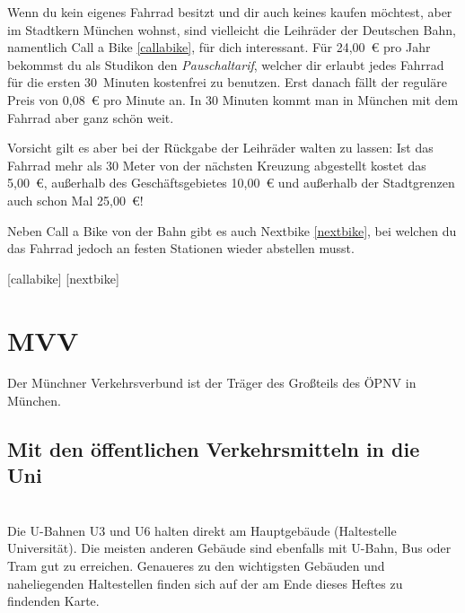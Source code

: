Wenn du kein eigenes Fahrrad besitzt und dir auch keines kaufen möchtest, aber im
Stadtkern München wohnst, sind vielleicht die Leihräder der Deutschen Bahn,
namentlich Call a Bike \ref{callabike}, für dich interessant. Für 24,00~€ pro
Jahr bekommst du als Studikon den \emph{Pauschaltarif}, welcher dir erlaubt jedes
Fahrrad für die ersten 30~Minuten kostenfrei zu benutzen. Erst danach fällt der
reguläre Preis von 0,08~€ pro Minute an. In 30 Minuten kommt man in München mit dem Fahrrad
aber ganz schön weit.

Vorsicht gilt es aber bei der Rückgabe der Leihräder walten zu lassen: Ist das
Fahrrad mehr als 30 Meter von der nächsten Kreuzung abgestellt kostet das
5,00~€, außerhalb des Geschäftsgebietes 10,00~€ und außerhalb der Stadtgrenzen
auch schon Mal 25,00~€!

Neben Call a Bike von der Bahn gibt es auch Nextbike \ref{nextbike}, bei
welchen du das Fahrrad jedoch an festen Stationen wieder abstellen musst.

\begin{urlList}
	[callabike]
	[nextbike]
\end{urlList}



\section{MVV}
Der Münchner Verkehrsverbund ist der Träger des Großteils des ÖPNV in München.

\subsection*{Mit den öffentlichen Verkehrsmitteln in die Uni}\hfill\\
Die U-Bahnen U3 und U6 halten direkt am Hauptgebäude (Haltestelle Universität).
Die meisten anderen Gebäude sind ebenfalls mit U-Bahn, Bus oder Tram gut zu
erreichen. Genaueres zu den wichtigsten Gebäuden und naheliegenden Haltestellen
finden sich auf der am Ende dieses Heftes zu findenden Karte.

